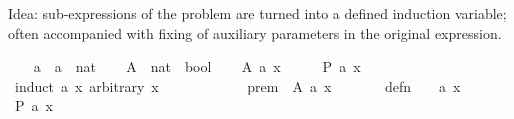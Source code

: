 \begin{isabellebody}
\begin{isamarkuptext}
  Idea: sub-expressions of the problem are turned into a defined
  induction variable; often accompanied with fixing of auxiliary
  parameters in the original expression.%
\end{isamarkuptext}%
\isamarkuptrue%
\isamarkupfalse%
\isanewline
{}\isanewline
%
\isadelimproof
\ \ %
\endisadelimproof
%
\isatagproof
{}\isamarkupfalse%
\ a\ {}{}\ {}{}a\ {}\ nat{}\isanewline
\ \ \isamarkupfalse%
\ A\ {}{}\ {}nat\ {}\ bool{}\isanewline
\isanewline
\ \ \isamarkupfalse%
\ {}A\ {}a\ x{}{}\isanewline
\ \ \isamarkupfalse%
\ \isamarkupfalse%
\ {}P\ {}a\ x{}{}\isanewline
\ \ \isamarkupfalse%
\ {}induct\ {}a\ x{}\ arbitrary{}\ x{}\isanewline
\ \ \ \ \isamarkupfalse%
\ {}\isanewline
\ \ \ \ \isamarkupfalse%
\ prem\ {}\ {}A\ {}a\ x{}{}\isanewline
\ \ \ \ \ \ \ defn\ {}\ {}{}\ {}\ a\ x{}\isanewline
\ \ \ \ \isamarkupfalse%
\ {}P\ {}a\ x{}{}\ \isamarkupfalse%
\isanewline
\ \ \isamarkupfalse%
\isanewline
\ \ \ \ \isamarkupfalse%

\end{isabellebody}
